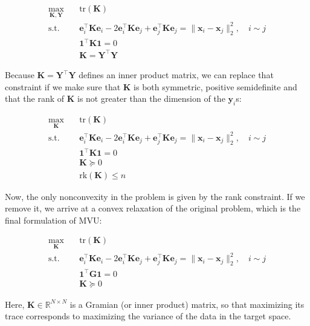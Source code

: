\begin{align}
\max_{\boldsymbol{K},\boldsymbol{Y}} \quad & \text{tr}(\boldsymbol{K})\\
\textrm{s.t.} \quad & \boldsymbol{e}_{i}^{\top}\boldsymbol{K}\boldsymbol{e}_{i} - 2 \boldsymbol{e}_{i}^{\top}\boldsymbol{K}\boldsymbol{e}_{j} + \boldsymbol{e}_{j}^{\top}\boldsymbol{K}\boldsymbol{e}_{j} =\|\boldsymbol{x}_{i}-\boldsymbol{x}_{j}\|_{2}^{2},\quad i\sim j\\
\quad & \boldsymbol{1}^{\top}\boldsymbol{K}\boldsymbol{1} = 0\\
\quad & \boldsymbol{K} = \boldsymbol{Y}^{\top}\boldsymbol{Y}
\end{align}

Because $\boldsymbol{K}=\boldsymbol{Y}^{\top}\boldsymbol{Y}$ defines an inner product matrix, we can replace that constraint if we make sure that $\boldsymbol{K}$ is both symmetric, positive semidefinite and that the rank of $\boldsymbol{K}$ is not greater than the dimension of the $\boldsymbol{y}_i$s:

\begin{align}
\max_{\boldsymbol{K}} \quad & \text{tr}(\boldsymbol{K})\\
\textrm{s.t.} \quad & \boldsymbol{e}_{i}^{\top}\boldsymbol{K}\boldsymbol{e}_{i} - 2 \boldsymbol{e}_{i}^{\top}\boldsymbol{K}\boldsymbol{e}_{j} + \boldsymbol{e}_{j}^{\top}\boldsymbol{K}\boldsymbol{e}_{j} =\|\boldsymbol{x}_{i}-\boldsymbol{x}_{j}\|_{2}^{2},\quad i\sim j\\
\quad & \boldsymbol{1}^{\top}\boldsymbol{K}\boldsymbol{1} = 0\\
\quad & \boldsymbol{K}\succeq 0\\
\quad & \text{rk}(\boldsymbol{K}) \leq n
\end{align}

Now, the only nonconvexity in the problem is given by the rank constraint. If we remove it, we arrive at a convex relaxation of the original problem, which is the final formulation of MVU:

\begin{align}
\max_{\boldsymbol{K}} \quad & \text{tr}(\boldsymbol{K})\\
\textrm{s.t.} \quad & \boldsymbol{e}_{i}^{\top}\boldsymbol{K}\boldsymbol{e}_{i} - 2 \boldsymbol{e}_{i}^{\top}\boldsymbol{K}\boldsymbol{e}_{j} + \boldsymbol{e}_{j}^{\top}\boldsymbol{K}\boldsymbol{e}_{j} =\|\boldsymbol{x}_{i}-\boldsymbol{x}_{j}\|_{2}^{2},\quad i\sim j\\
\quad & \boldsymbol{1}^{\top}\boldsymbol{G}\boldsymbol{1} = 0\\
\quad & \boldsymbol{K}\succeq 0
\end{align}

Here, $\boldsymbol{K}\in\mathbb{R}^{N\times N}$ is a Gramian (or inner product) matrix, so that maximizing its trace corresponds to maximizing the variance of the data in the target space.

